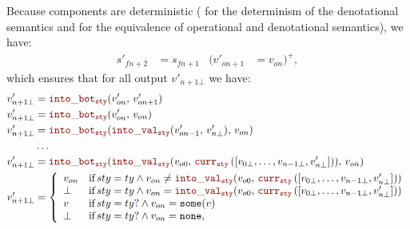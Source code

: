 \begin{skippableproof}
\begin{itemize}
              Because components are deterministic (\cf {}
              for the determinism of the denotational semantics and 
              for the equivalence of operational and denotational semantics), we have:
              \begin{align*}
                  s'_{fn+2} & = s_{fn+1} & (v'_{on+1} & = v_{on})^+,
              \end{align*}
              which ensures that for all output $v'_{n+1\bot}$ we have:
              \begin{align*}
                  v'_{n+1\bot} & = \intoBot{sty}{v'_{on}}{v'_{on+1}}                                                                        \\
                  v'_{n+1\bot} & = \intoBot{sty}{v'_{on}}{v_{on}}                                                                           \\
                  v'_{n+1\bot} & = \intoBot{sty}{\intoVal{sty}{v'_{on-1}}{v'_{n\bot}}}{v_{on}}                                              \\
                               & \dots                                                                                                      \\
                  v'_{n+1\bot} & = \intoBot{sty}{\intoVal{sty}{v_{o0}}{\CurrVal{sty}{[v_{0\bot}, \dots, v_{n-1\bot}, v'_{n\bot}]}}}{v_{on}} \\
                  v'_{n+1\bot} & = \left\{
                  \begin{array}{ll}
                      v_{on} & \text{if} \, sty = ty \wedge v_{on} \neq \intoVal{sty}{v_{o0}}{\CurrVal{sty}{[v_{0\bot}, \dots, v_{n-1\bot}, v'_{n\bot}]}} \\
                      \bot   & \text{if} \, sty = ty \wedge v_{on} =    \intoVal{sty}{v_{o0}}{\CurrVal{sty}{[v_{0\bot}, \dots, v_{n-1\bot}, v'_{n\bot}]}} \\
                      v      & \text{if} \, sty = \mayB{ty} \wedge v_{on} = \some{v}                                                                      \\
                      \bot   & \text{if} \, sty = \mayB{ty} \wedge v_{on} = \none,
                  \end{array}
                  \right.                                                                                                                   \\

\end{align*}
\end{itemize}
\end{skippableproof}
